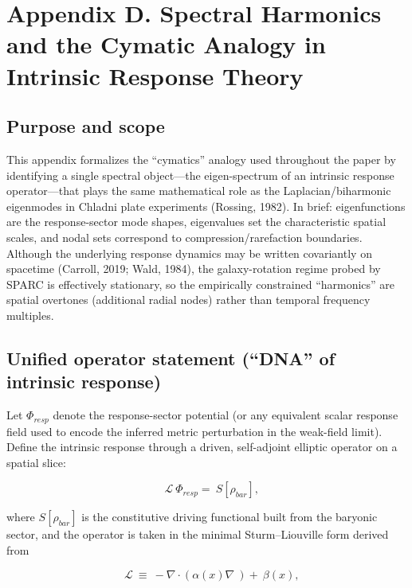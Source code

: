 \documentclass[11pt]{article}
\begin{document}
\section{Appendix D. Spectral Harmonics and the Cymatic Analogy in Intrinsic Response Theory}\label{appendix-d.-spectral-harmonics-and-the-cymatic-analogy-in-intrinsic-response-theory}

\subsection{Purpose and scope}\label{d.1-purpose-and-scope}

This appendix formalizes the ``cymatics'' analogy used throughout the paper by identifying a single spectral object---the eigen-spectrum of an intrinsic response operator---that plays the same mathematical role as the Laplacian/biharmonic eigenmodes in Chladni plate experiments \citep{Rossing1982Chladni, Tuan2014Nodal} (Rossing, 1982). In brief: eigenfunctions are the response-sector mode shapes, eigenvalues set the characteristic spatial scales, and nodal sets correspond to compression/rarefaction boundaries. Although the underlying response dynamics may be written covariantly on spacetime (Carroll, 2019; Wald, 1984), the galaxy-rotation regime probed by SPARC is effectively stationary, so the empirically constrained ``harmonics'' are spatial overtones (additional radial nodes) rather than temporal frequency multiples.

\subsection{Unified operator statement (``DNA'' of intrinsic response)}\label{d.2-unified-operator-statement-dna-of-intrinsic-response}

Let \(\Phi_{resp}\) denote the response-sector potential (or any equivalent scalar response field used to encode the inferred metric perturbation in the weak-field limit). Define the intrinsic response through a driven, self-adjoint elliptic operator on a spatial slice:

\[\ \ \ \ \mathcal{L}\ \Phi_{resp} = \ S\left\lbrack \rho_{bar} \right\rbrack,\]

where \(S\left\lbrack \rho_{bar} \right\rbrack\) is the constitutive driving functional built from the baryonic sector, and the operator is taken in the minimal Sturm--Liouville form derived from \citep{BenderOrszag1999, KevorkianCole1996}

\[\ \ \ \ \mathcal{L}\  \equiv \  - \nabla \cdot \left( \alpha(x)\nabla\  \right) + \ \beta(x),\]
\end{document}
